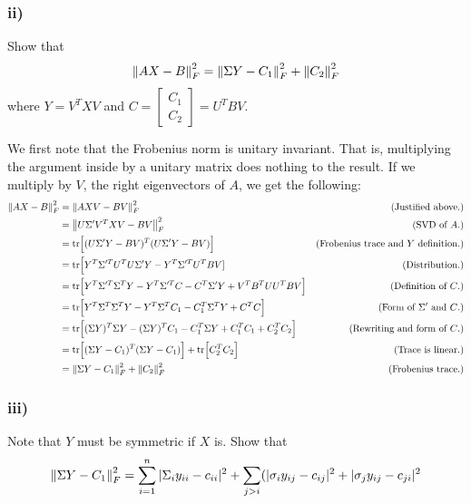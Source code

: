 \subsubsection{ii)}
Show that 
\[
\norm{AX - B}_F^2 = \norm{\Sigma Y - C_1}_F^2 + \norm{C_2}_F^2
\]
where $Y = V^TXV$ and $C = \begin{bmatrix}C_1\\C_2\end{bmatrix} = U^TBV$.
\partbreak
\begin{solution}

    We first note that the Frobenius norm is unitary invariant. That is, multiplying the argument inside by a unitary matrix does nothing to the result. If we multiply by $V$, the right eigenvectors of $A$, we get the following:
\newpage
    \alignbreak
    \begin{align}
        \norm{AX - B}_F^2 &= \norm{AXV - BV}_F^2 &\text{(Justified above.)}\nonumber\\
        &= \norm{U\Sigma ' V^TXV - BV}_F^2 &\text{(SVD of $A$.)}\nonumber\\
        &= \text{tr} \Big[ (U\Sigma' Y - BV)^T(U\Sigma' Y - BV) \Big] &\text{(Frobenius trace and $Y$ definition.)}\nonumber\\
        &= \text{tr} \Big[ Y^T\Sigma'^T U^TU\Sigma 'Y - Y^T\Sigma'^TU^TBV] &\text{(Distribution.)}\nonumber\\
        &= \text{tr} \Big[ Y^T\Sigma'^T\Sigma^T Y - Y^T\Sigma'^TC - C^T\Sigma' Y + V^TB^TUU^TBV\Big] &\text{(Definition of $C$.)}\nonumber\\
        &= \text{tr} \Big[ Y^T\Sigma^T \Sigma^T Y - Y^T\Sigma ^TC_1 - C_1^T\Sigma^TY + C^TC\Big] &\text{(Form of $\Sigma'$ and $C$.)}\nonumber\\
        &= \text{tr} \Big[ (\Sigma Y)^T\Sigma Y - (\Sigma Y)^TC_1 - C_1^T \Sigma Y + C_1^TC_1 + C_2^TC_2\Big] &\text{(Rewriting and form of $C$.)}\nonumber\\
        &= \text{tr} \Big[ (\Sigma Y - C_1)^T(\Sigma Y - C_1)\Big] + \text{tr} \Big[ C_2^TC_2\Big] &\text{(Trace is linear.)}\nonumber\\
        &=\norm{\Sigma Y - C_1}_F^2 + \norm{C_2}_F^2 &\text{(Frobenius trace.)}\nonumber
    \end{align}
    \alignbreak
\end{solution}
\newpage
    \subsubsection{iii)}
    Note that $Y$ must be symmetric if $X$ is. Show that
    \[
    \norm{\Sigma Y - C_1}_F^2 = \sum_{i = 1}^n |\Sigma_iy_{ii} - c_{ii}|^2 + \sum_{j > i} (|\sigma_iy_{ij} - c_{ij}|^2 + |\sigma_jy_{ij} - c_{ji}|^2 
    \]

